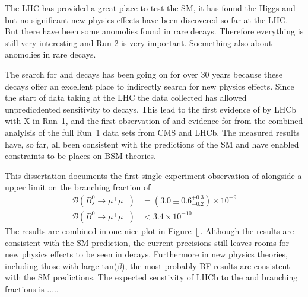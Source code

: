 \label{sec:summary}

The LHC has provided a great place to test the SM, it has found the Higgs and but no significant new physics effects have been discovered so far at the LHC. But there have been some anomolies found in rare decays. Therefore everything is still very interesting and Run 2 is very important. 
Soemething also about anomolies in rare decays.

The search for \bsmumu and \bdmumu decays has been going on for over 30 years because these decays offer an excellent place to indirectly search for new physics effects. Since the start of data taking at the LHC the data collected has allowed unpredicdented sensitivity to \bmumu decays. This lead to the first evidence of \bsmumu by LHCb with X \fb in Run~1, and the first observation of \bsmumu and evidence for \bdmumu from the combined analylsis of the full Run~1 data sets from CMS and LHCb. The measured results have, so far, all been consistent with the predictions of the SM and have enabled constraints to be places on BSM theories. %


This dissertation documents the first single experiment observation of \bsmumu alongside a upper limit on the \bdmumu branching fraction of
\begin{equation}
\begin{split}
  \mathcal{B}(B^{0}_{s} \to \mu^{+} \mu^{-}) &= (3.0 \pm 0.6^{+0.3}_{-0.2}) \times 10^{-9} \\
  \mathcal{B}(B^{0} \to \mu^{+} \mu^{-}) &< 3.4    \times 10^{-10}
\end{split}
\label{eq:BFresults2}
\end{equation}
The results are combined in one nice plot in Figure~\ref{}. Although the results are consistent with the SM prediction, the current precisions still leaves rooms for new physics effects to be seen in \bsmumu decays. Furthermore in new physics theories, including those with large tan($\beta$), the most probably BF results are consistent with the SM predictions. %
The expected senstivity of LHCb to the \bsmumu and \bdmumu branching fractions is .....



